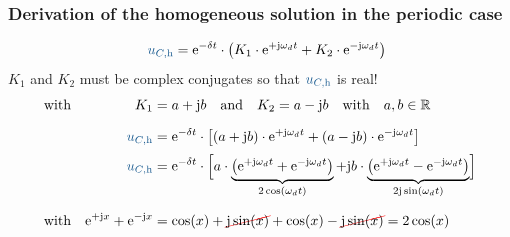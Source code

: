 \subsubsection{Derivation of the homogeneous solution in the periodic case}
\label{sec:schaltvorgaengezeitbereich:exkurse:herleitung}
%
\begin{frame}[t]
\ifvmode\vspace*{-\baselineskip}\setlength{\parskip}{0ex}\fi%
\begin{align}
    &&
        \ecv{u_{C,\mathrm{h}}} &= \mathrm{e}^{-\delta t} \cdot \left( K_1 \cdot \mathrm{e}^{+\mathrm{j}\omega_d t} + K_2 \cdot \mathrm{e}^{-\mathrm{j}\omega_d t} \right) \nonumber\\
\end{align}
$K_1$ and $K_2$ must be complex conjugates so that $\ecv{u_{C,\mathrm{h}}}$ is real! 
\begin{align}
&\text{with}&
        K_1 &= a + \mathrm{j} b \mathrlap{\quad\text{and}\quad K_2 = a - \mathrm{j} b\quad\text{with}\quad a,b \in \mathbb{R}} \nonumber\\[6pt]
    &&
        \ecv{u_{C,\mathrm{h}}} &= \mathrm{e}^{-\delta t} \cdot \left[ (a + \mathrm{j} b) \cdot \mathrm{e}^{+\mathrm{j}\omega_d t} + (a - \mathrm{j} b) \cdot \mathrm{e}^{-\mathrm{j}\omega_d t} \right] \nonumber\\[2pt]
    &&
        \ecv{u_{C,\mathrm{h}}} &= \mathrm{e}^{-\delta t} \cdot
            \left[\vphantom{\Big|}
            \smash{ a \cdot
            \underbrace{\left(
                \mathrm{e}^{+\mathrm{j}\omega_d t} + \mathrm{e}^{-\mathrm{j}\omega_d t}
            \right)}_{2\cos(\omega_d t)}
            + \mathrm{j} b \cdot
            \underbrace{\left(
                \mathrm{e}^{+\mathrm{j}\omega_d t} - \mathrm{e}^{-\mathrm{j}\omega_d t}
            \right)}_{2\mathrm{j}\sin(\omega_d t)}
            }\right] \nonumber\\[20pt]
    &\text{with}&
        \mathrm{e}^{+\mathrm{j}x} + \mathrm{e}^{-\mathrm{j}x} &= \cos(x) + \redcancel{\mathrm{j}\sin(x)} + \cos(x) - \redcancel{\mathrm{j}\sin(x)} = 2\cos(x) \nonumber\\

\end{align}
\end{frame}
